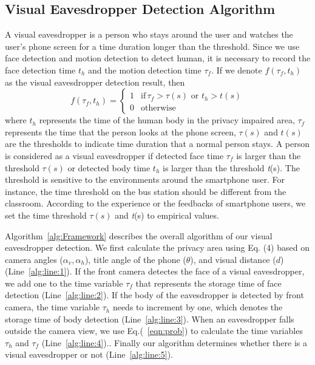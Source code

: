 \subsection{Visual Eavesdropper Detection Algorithm}
A visual eavesdropper is a person who stays around the user and watches the user's phone screen for a time duration longer than the threshold.  Since  we use face detection and motion detection to detect human, it is necessary to record the face detection time $t_h$ and the motion detection time $\tau_f$. If we denote   $f(\tau_f,\textit{t}_h)$ as the visual eavesdropper detection result, then
\begin{equation}
f(\tau_f,\textit{t}_h)=
\begin{cases}
1 & \text{if}\,\tau_f>\tau(s) \textrm{ or } \textit{t}_h>\textit{t}(s)\\
0 & \text{otherwise}
\end{cases}
\end{equation}
where $t_h$ represents the time of the human body in the privacy impaired area,  $\tau_f$ represents the time that the person looks at the phone screen, $\tau(s)$ and $t(s)$ are the thresholds to indicate time duration that a normal person stays.
A person is considered as a visual eavesdropper if detected face time $\tau_f$ is larger than the threshold $\tau(s)$ or detected body time $\textit{t}_h$  is larger than the threshold \textit{t}(s).
The threshold is sensitive to the environments around the smartphone user. For instance, the time threshold on the bus station should be different from the classroom.  According to the experience or the feedbacks of smartphone users, we set the time threshold $\tau(s)$ and \textit{t}(s) to empirical values.



Algorithm~\ref{alg:Framework} describes the overall algorithm of our visual eavesdropper detection.
We first calculate the privacy area using Eq. (4) based on camera angles ($\alpha_v,\alpha_h$), title angle of the phone ($\theta$), and visual distance ($d$) (Line~\ref{alg:line:1}).  If the front camera detectes the face of a visual eavesdropper, we add one to the time variable $\tau_f$ that represents the storage time of face detection (Line~\ref{alg:line:2}).  If the body of the eavesdropper is detected by front camera, the time variable $\tau_h$ needs to increment by one, which denotes the storage time of body detection  (Line~\ref{alg:line:3}).
When an eavesdropper falls outside the camera view, we use Eq.(~\ref{eqn:prob}) to calculate the time  variables $\tau_h$ and  $\tau_f$ (Line~\ref{alg:line:4})..
Finally our algorithm determines whether there is a   visual eavesdropper or not (Line~\ref{alg:line:5}).

